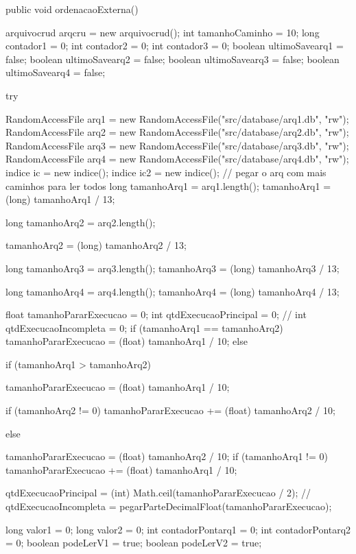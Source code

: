 public void ordenacaoExterna() {
  
    arquivocrud arqcru = new arquivocrud();
    int tamanhoCaminho = 10;
    long contador1 = 0;
    int contador2 = 0;
    int contador3 = 0;
    boolean ultimoSavearq1 = false;
    boolean ultimoSavearq2 = false;
    boolean ultimoSavearq3 = false;
    boolean ultimoSavearq4 = false;

    try {

      RandomAccessFile arq1 = new RandomAccessFile("src/database/arq1.db", "rw");
      RandomAccessFile arq2 = new RandomAccessFile("src/database/arq2.db", "rw");
      RandomAccessFile arq3 = new RandomAccessFile("src/database/arq3.db", "rw");
      RandomAccessFile arq4 = new RandomAccessFile("src/database/arq4.db", "rw");
      indice ic = new indice();
      indice ic2 = new indice();
      // pegar o arq com mais caminhos para ler todos
      long tamanhoArq1 = arq1.length();
      tamanhoArq1 = (long) tamanhoArq1 / 13;

      long tamanhoArq2 = arq2.length();

      tamanhoArq2 = (long) tamanhoArq2 / 13;

      long tamanhoArq3 = arq3.length();
      tamanhoArq3 = (long) tamanhoArq3 / 13;

      long tamanhoArq4 = arq4.length();
      tamanhoArq4 = (long) tamanhoArq4 / 13;

      float tamanhoPararExecucao = 0;
      int qtdExecucaoPrincipal = 0;
      // int qtdExecucaoIncompleta = 0;
      if (tamanhoArq1 == tamanhoArq2) {
        tamanhoPararExecucao = (float) tamanhoArq1 / 10;
      } else {
        if (tamanhoArq1 > tamanhoArq2) {
          tamanhoPararExecucao = (float) tamanhoArq1 / 10;

          if (tamanhoArq2 != 0) {
            tamanhoPararExecucao += (float) tamanhoArq2 / 10;
          }

        } else {
          tamanhoPararExecucao = (float) tamanhoArq2 / 10;
          if (tamanhoArq1 != 0) {
            tamanhoPararExecucao += (float) tamanhoArq1 / 10;
          }

        }
      }

      qtdExecucaoPrincipal = (int) Math.ceil(tamanhoPararExecucao / 2);
      // qtdExecucaoIncompleta = pegarParteDecimalFloat(tamanhoPararExecucao);

      long valor1 = 0;
      long valor2 = 0;
      int contadorPontarq1 = 0;
      int contadorPontarq2 = 0;
      boolean podeLerV1 = true;
      boolean podeLerV2 = true;

}}
